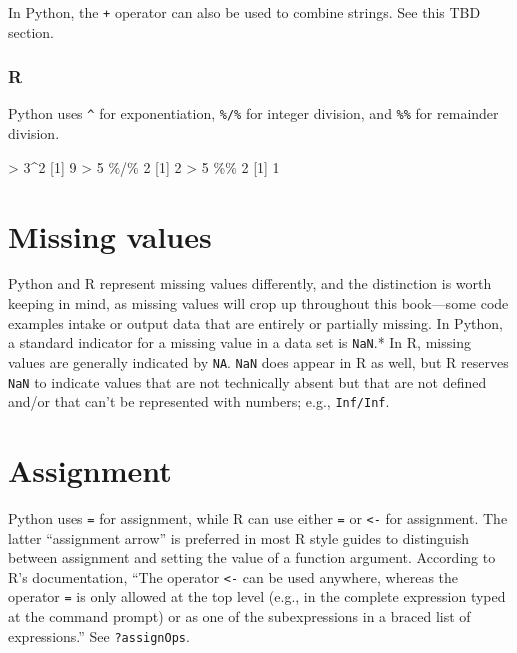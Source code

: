 \documentclass[
]{book}
\newenvironment{Shaded}{\begin{snugshade}}{\end{snugshade}}
\newcommand{\DecValTok}[1]{\textcolor[rgb]{0.00,0.00,0.81}{#1}}
\newcommand{\NormalTok}[1]{#1}
\newcommand{\SpecialCharTok}[1]{\textcolor[rgb]{0.00,0.00,0.00}{#1}}
\begin{document}
In Python, the \texttt{+} operator can also be used to combine strings. See this TBD section.

\hypertarget{r}{%
\subsubsection*{R}\label{r}}

Python uses \texttt{\^{}} for exponentiation, \texttt{\%/\%} for integer division, and \texttt{\%\%} for remainder division.

\begin{Shaded}
\begin{Highlighting}[]
\SpecialCharTok{\textgreater{}} \DecValTok{3}\SpecialCharTok{\^{}}\DecValTok{2}
\NormalTok{[}\DecValTok{1}\NormalTok{] }\DecValTok{9}
\SpecialCharTok{\textgreater{}} \DecValTok{5} \SpecialCharTok{\%/\%} \DecValTok{2}
\NormalTok{[}\DecValTok{1}\NormalTok{] }\DecValTok{2}
\SpecialCharTok{\textgreater{}} \DecValTok{5} \SpecialCharTok{\%\%} \DecValTok{2}
\NormalTok{[}\DecValTok{1}\NormalTok{] }\DecValTok{1}
\end{Highlighting}
\end{Shaded}

\hypertarget{missing-values}{%
\section{Missing values}\label{missing-values}}

Python and R represent missing values differently, and the distinction is worth keeping in mind, as missing values will crop up throughout this book---some code examples intake or output data that are entirely or partially missing. In Python, a standard indicator for a missing value in a data set is \texttt{NaN}.* In R, missing values are generally indicated by \texttt{NA}. \texttt{NaN} does appear in R as well, but R reserves \texttt{NaN} to indicate values that are not technically absent but that are not defined and/or that can't be represented with numbers; e.g., \texttt{Inf/Inf}.

\hypertarget{assignment}{%
\section{Assignment}\label{assignment}}

Python uses \texttt{=} for assignment, while R can use either \texttt{=} or \texttt{\textless{}-} for assignment. The latter ``assignment arrow'' is preferred in most R style guides to distinguish between assignment and setting the value of a function argument. According to R's documentation, ``The operator \texttt{\textless{}-} can be used anywhere, whereas the operator \texttt{=} is only allowed at the top level (e.g., in the complete expression typed at the command prompt) or as one of the subexpressions in a braced list of expressions.'' See \texttt{?assignOps}.
\end{document}
